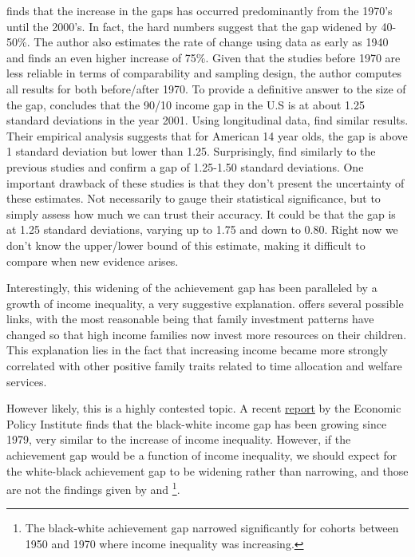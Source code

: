 \documentclass[11pt, a4paper]{article}\usepackage[]{graphicx}\usepackage[]{color}
\begin{document}
\citet{reardon2011} finds that the increase in the gaps has occurred predominantly from the 1970's until the 2000's. In fact, the hard numbers suggest that the gap widened by 40-50\%. The author also estimates the rate of change using data as early as 1940 and finds an even higher increase of   75\%. Given that the studies before 1970 are less reliable in terms of comparability and sampling design, the author computes all results for both before/after 1970. To provide a definitive answer to the size of the gap, \citet{reardon2011} concludes that the 90/10 income gap in the U.S is at about 1.25 standard deviations in the year 2001. Using longitudinal data, \citet{bradbury2015} find similar results. Their empirical analysis suggests that for American 14 year olds, the gap is above 1 standard deviation but lower than 1.25. Surprisingly, \citet{duncan2011} find similarly to the previous studies and confirm a gap of  1.25-1.50 standard deviations. One important drawback of these studies is that they don't present the uncertainty of these estimates. Not necessarily to gauge their statistical significance, but to simply assess how much we can trust their accuracy. It could be that the gap is at  1.25 standard deviations, varying up to 1.75 and down to 0.80. Right now we don't know the upper/lower bound of this estimate, making it difficult to compare when new evidence arises.

Interestingly, this widening of the achievement gap has been paralleled by a growth of income inequality, a very suggestive explanation. \citet{reardon2011} offers several possible links, with the most reasonable being that family investment patterns have changed so that high income families now invest more resources on their children. This explanation lies in the fact that increasing income became more strongly correlated with other positive family traits related to time allocation and welfare services.

However likely, this is a highly contested topic. A recent \href{http://www.epi.org/files/pdf/101972.pdf}{report} by the Economic Policy Institute finds that the black-white income gap has been growing since 1979, very similar to the increase of income inequality. However, if the achievement gap would be a function of income inequality, we should expect for the white-black achievement gap to be widening rather than narrowing, and those are not the findings given by \citet{reardon2011} and \citet{magnuson2008} \footnote{The black-white achievement gap narrowed significantly for cohorts between 1950 and 1970 where income inequality was increasing.}.
\end{document}
